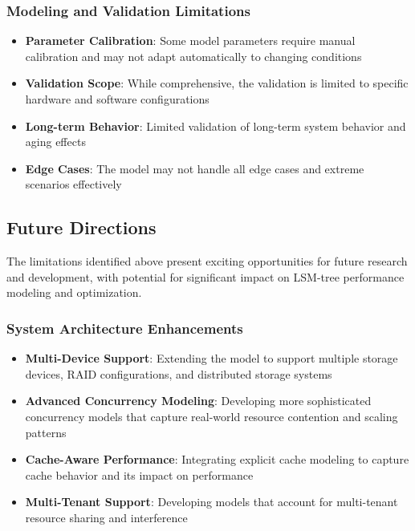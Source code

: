 \documentclass[11pt]{article}
\begin{document}
\subsubsection{Modeling and Validation Limitations}
\begin{itemize}
    \item \textbf{Parameter Calibration}: Some model parameters require manual calibration and may not adapt automatically to changing conditions
    \item \textbf{Validation Scope}: While comprehensive, the validation is limited to specific hardware and software configurations
    \item \textbf{Long-term Behavior}: Limited validation of long-term system behavior and aging effects
    \item \textbf{Edge Cases}: The model may not handle all edge cases and extreme scenarios effectively
\end{itemize}

\subsection{Future Directions}

The limitations identified above present exciting opportunities for future research and development, with potential for significant impact on LSM-tree performance modeling and optimization.

\subsubsection{System Architecture Enhancements}
\begin{itemize}
    \item \textbf{Multi-Device Support}: Extending the model to support multiple storage devices, RAID configurations, and distributed storage systems
    \item \textbf{Advanced Concurrency Modeling}: Developing more sophisticated concurrency models that capture real-world resource contention and scaling patterns
    \item \textbf{Cache-Aware Performance}: Integrating explicit cache modeling to capture cache behavior and its impact on performance
    \item \textbf{Multi-Tenant Support}: Developing models that account for multi-tenant resource sharing and interference
\end{itemize}
\end{document}
